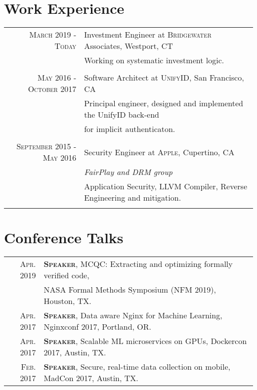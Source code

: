 \documentclass[lettersize,11pt]{article}
\begin{document}
\section{Work Experience}
\begin{tabular}{rl}
\textsc{March 2019 - Today} & Investment Engineer at \textsc{Bridgewater} Associates, Westport, CT\\
&\footnotesize{Working on systematic investment logic.}\\\multicolumn{2}{c}{} \\

\textsc{May 2016 - October 2017} & Software Architect at \textsc{UnifyID}, San Francisco, CA\\
&\footnotesize{Principal engineer, designed and implemented the UnifyID back-end}\\
&\footnotesize{for implicit authenticaton.}\\\multicolumn{2}{c}{} \\

\textsc{September 2015 - May 2016} & Security Engineer at \textsc{Apple}, Cupertino, CA \\&\emph{FairPlay and DRM group}\\
&\footnotesize{Application Security, LLVM Compiler, Reverse Engineering and mitigation.} \\\multicolumn{2}{c}{} \\
\end{tabular}


\section{Conference Talks}
\begin{tabular}{rl}
    \textsc{Apr.} 2019 & \textsc{\textbf{Speaker}}, MCQC: Extracting and optimizing formally verified code, \\
     &                                              NASA Formal Methods Symposium (NFM 2019), Houston, TX. \\
    \textsc{Apr.} 2017 & \textsc{\textbf{Speaker}}, Data aware Nginx for Machine Learning, Nginxconf 2017, Portland, OR. \\
    \textsc{Apr.} 2017 & \textsc{\textbf{Speaker}}, Scalable ML microservices on GPUs, Dockercon 2017, Austin, TX. \\
    \textsc{Feb.} 2017 & \textsc{\textbf{Speaker}}, Secure, real-time data collection on mobile, MadCon 2017, Austin, TX. \\
\end{tabular}
\end{document}
